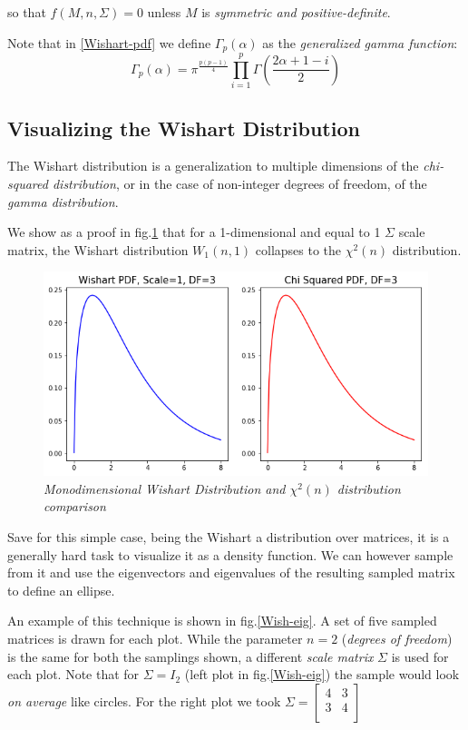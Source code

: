\documentclass[12pt,openright,twoside,a4paper]{book}
\begin{document}
so that $f(M, n, \Sigma)=0$ unless $M$ is \textit{symmetric and positive-definite}. \cite{IMS}

Note that in \ref{Wishart-pdf} we define $\Gamma_p(\alpha)$ as the \textit{generalized gamma function}:
\begin{equation}
\Gamma_p(\alpha)=\pi^\frac{p(p-1)}{4}\prod_{i=1}^p\Gamma(\frac{2\alpha+1-i}{2})
\end{equation}

\subsection{Visualizing the Wishart Distribution}

The Wishart distribution is a generalization to multiple dimensions of the \textit{chi-squared distribution}, or in the case of non-integer degrees of freedom, of the \textit{gamma distribution}.

We show as a proof in fig.\ref{Wish-chi2} that for a 1-dimensional and equal to 1 $\Sigma$ scale matrix, the Wishart distribution $W_1(n,1)$ collapses to the $\chi^2(n)$ distribution.

\begin{figure}[!h]
\centering
\includegraphics[scale=0.37]{wish-chi}
\caption{\textit{Monodimensional Wishart Distribution and $\chi^2(n)$ distribution comparison}}
\label{Wish-chi2}
\end{figure}

Save for this simple case, being the Wishart a distribution over matrices, it is a generally hard task to visualize it as a density function.
We can however sample from it and use the eigenvectors and eigenvalues of the resulting sampled matrix to define an ellipse.

An example of this technique is shown in fig.\ref{Wish-eig}. A set of five sampled matrices is drawn for each plot. While the parameter $n=2$ (\textit{degrees of freedom}) is the same for both the samplings shown, a different \textit{scale matrix} $\Sigma$ is used for each plot.
Note that for $\Sigma=I_2$ (left plot in fig.\ref{Wish-eig}) the sample would look \textit{on average} like circles. For the right plot we took $\Sigma=
\begin{bmatrix}
       4 & 3  \\
    	   3 & 4  \\ 	  
\end{bmatrix}$
\end{document}

